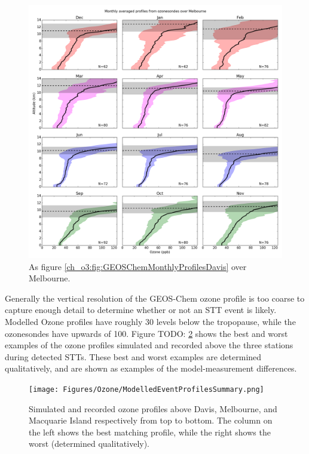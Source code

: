     \begin{figure}[!htbp]
      \includegraphics[width=\textwidth]{Figures/Ozone/Melbourne_sonde_monthprofiles.png}
      \caption{As figure \ref{ch_o3:fig:GEOSChemMonthlyProfilesDavis} over Melbourne.}
      \label{ch_o3:fig:GEOSChemMonthlyProfilesMelbourne}
    \end{figure}
    
    Generally the vertical resolution of the GEOS-Chem ozone profile is too coarse to capture enough detail to determine whether or not an STT event is likely.
    Modelled Ozone profiles have roughly 30 levels below the tropopause, while the ozonesondes have upwards of 100.
    Figure TODO: \ref{ch_o3:fig:GEOSChemEventProfilesSummary} shows the best and worst examples of the ozone profiles simulated and recorded above the three stations during detected STTs.
    These best and worst examples are determined qualitatively, and are shown as examples of the model-measurement differences.
    
    \begin{figure}[!htbp]
      \texttt{[image: Figures/Ozone/ModelledEventProfilesSummary.png]}
      \caption{Simulated and recorded ozone profiles above Davis, Melbourne, and Macquarie Island respectively from top to bottom.
      The column on the left shows the best matching profile, while the right shows the worst (determined qualitatively).}
      \label{ch_o3:fig:GEOSChemEventProfilesSummary}
    \end{figure}
    
